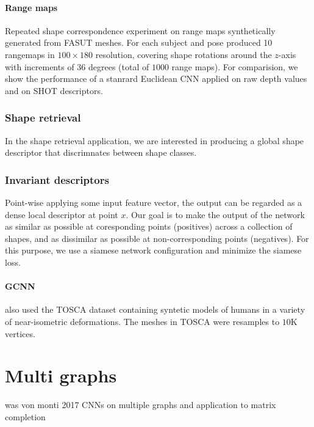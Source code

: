 \documentclass[pdftex,10pt,a4paper]{scrartcl}
\begin{document}
\paragraph{Range maps}

Repeated shape correspondence experiment on range maps synthetically generated from FASUT meshes.
For each subject and pose produced 10 rangemaps in $100 \times 180$ resolution, covering shape rotations around the $z$-axis with increments of $36$ degrees (total of $1000$ range maps).
For comparision, we show the performance of a stanrard Euclidean CNN applied on raw depth values and on SHOT descriptors.

\subsubsection{Shape retrieval}

In the shape retrieval application, we are interested in producing a global shape descriptor that discrimnates between shape classes.

\subsubsection{Invariant descriptors}

Point-wise applying some input feature vector, the output can be regarded as a dense local descriptor at point $x$.
Our goal is to make the output of the network as similar as possible at coresponding points (positives) across a collection of shapes, and as dissimilar as possible at non-corresponding points (negatives).
For this purpose, we use a siamese network configuration and minimize the siamese loss.

\paragraph{GCNN}

also used the TOSCA dataset containing syntetic models of humans in a variety of near-isometric deformations.
The meshes in TOSCA were resamples to $10$K vertices.

\section{Multi graphs}

was von monti 2017
CNNs on multiple graphs and application to matrix completion



\end{document}
